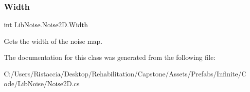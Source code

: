 \subsubsection{\texorpdfstring{Width}{Width}}
{\footnotesize\ttfamily int Lib\+Noise.\+Noise2\+D.\+Width\hspace{0.3cm}{\ttfamily [get]}}



Gets the width of the noise map. 



The documentation for this class was generated from the following file\+:\begin{DoxyCompactItemize}
\item 
C\+:/\+Users/\+Ristaccia/\+Desktop/\+Rehabilitation/\+Capstone/\+Assets/\+Prefabs/\+Infinite/\+Code/\+Lib\+Noise/Noise2\+D.\+cs\end{DoxyCompactItemize}
